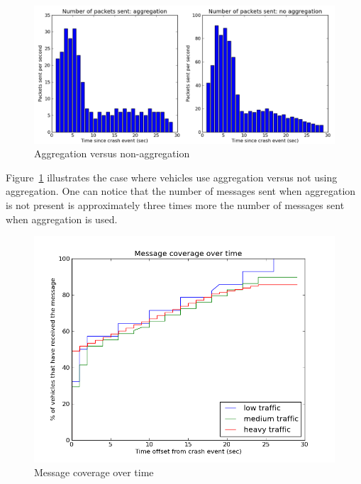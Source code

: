 \documentclass{IEEEtran}
\begin{document}
\noindent
\begin{figure}[h]
\centering
\includegraphics[scale=0.32]{Figure_02.png}
\caption{Aggregation versus non-aggregation}
\label{fig_aggregation_nonaggregation}
\end{figure}

Figure~\ref{fig_aggregation_nonaggregation} illustrates the case where vehicles use aggregation versus not using aggregation.
One can notice that the number of messages sent when aggregation is not present is approximately three times more the number of messages sent when aggregation is used.

\noindent
\begin{figure}[h]
\centering
\includegraphics[scale=0.45]{Figure_03.png}
\caption{Message coverage over time}
\label{fig_msg_coverage}
\end{figure}
\end{document}
